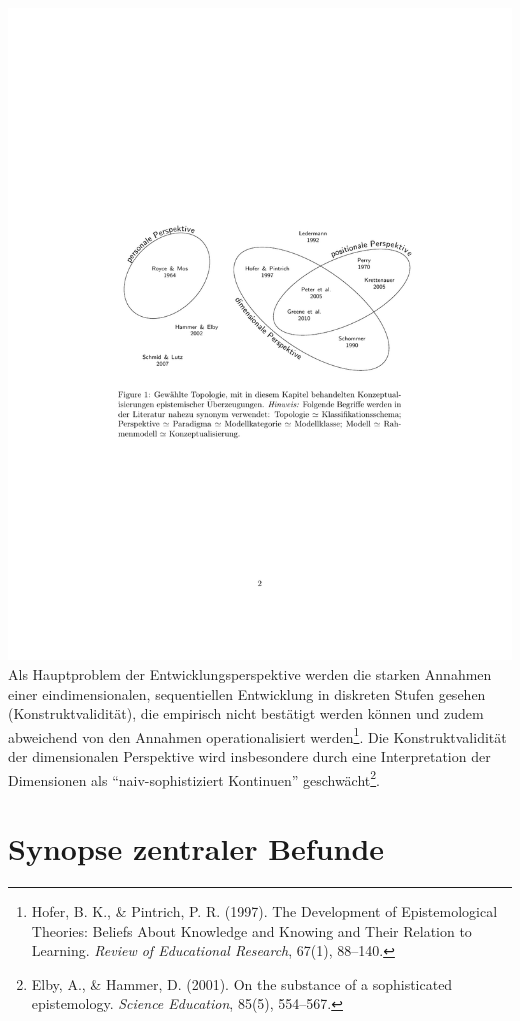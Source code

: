 \documentclass[]{tufte-handout}
\begin{document}
\includegraphics{../Img/Topologie.pdf} Als Hauptproblem der
Entwicklungsperspektive werden die starken Annahmen einer
eindimensionalen, sequentiellen Entwicklung in diskreten Stufen gesehen
(Konstruktvalidität), die empirisch nicht bestätigt werden können und
zudem abweichend von den Annahmen operationalisiert werden\footnote{Hofer,
  B. K., \& Pintrich, P. R. (1997). The Development of Epistemological
  Theories: Beliefs About Knowledge and Knowing and Their Relation to
  Learning. \emph{Review of Educational Research}, 67(1), 88--140.}. Die
Konstruktvalidität der dimensionalen Perspektive wird insbesondere durch
eine Interpretation der Dimensionen als ``naiv-sophistiziert Kontinuen''
geschwächt\footnote{Elby, A., \& Hammer, D. (2001). On the substance of
  a sophisticated epistemology. \emph{Science Education}, 85(5),
  554--567.}.
\pagebreak
\section{Synopse zentraler Befunde}\label{synopse-zentraler-befunde}
\end{document}
